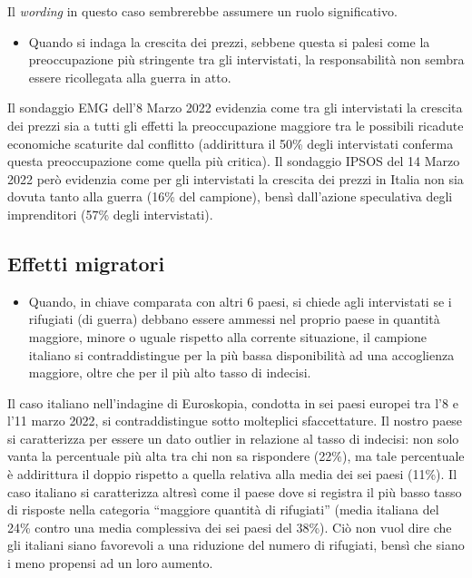 \documentclass[
]{book}
\providecommand{\tightlist}{%
  \setlength{\itemsep}{0pt}\setlength{\parskip}{0pt}}
\begin{document}
Il \emph{wording} in questo caso sembrerebbe assumere un ruolo significativo.

\begin{itemize}
\tightlist
\item
  Quando si indaga la crescita dei prezzi, sebbene questa si palesi come la preoccupazione più stringente tra gli intervistati, la responsabilità non sembra essere ricollegata alla guerra in atto.
\end{itemize}

Il sondaggio EMG dell'8 Marzo 2022 evidenzia come tra gli intervistati la crescita dei prezzi sia a tutti gli effetti la preoccupazione maggiore tra le possibili ricadute economiche scaturite dal conflitto (addirittura il 50\% degli intervistati conferma questa preoccupazione come quella più critica). Il sondaggio IPSOS del 14 Marzo 2022 però evidenzia come per gli intervistati la crescita dei prezzi in Italia non sia dovuta tanto alla guerra (16\% del campione), bensì dall'azione speculativa degli imprenditori (57\% degli intervistati).

\hypertarget{effetti-migratori}{%
\subsection{Effetti migratori}\label{effetti-migratori}}

\begin{itemize}
\tightlist
\item
  Quando, in chiave comparata con altri 6 paesi, si chiede agli intervistati se i rifugiati (di guerra) debbano essere ammessi nel proprio paese in quantità maggiore, minore o uguale rispetto alla corrente situazione, il campione italiano si contraddistingue per la più bassa disponibilità ad una accoglienza maggiore, oltre che per il più alto tasso di indecisi.
\end{itemize}

Il caso italiano nell'indagine di Euroskopia, condotta in sei paesi europei tra l'8 e l'11 marzo 2022, si contraddistingue sotto molteplici sfaccettature. Il nostro paese si caratterizza per essere un dato outlier in relazione al tasso di indecisi: non solo vanta la percentuale più alta tra chi non sa rispondere (22\%), ma tale percentuale è addirittura il doppio rispetto a quella relativa alla media dei sei paesi (11\%).
Il caso italiano si caratterizza altresì come il paese dove si registra il più basso tasso di risposte nella categoria ``maggiore quantità di rifugiati'' (media italiana del 24\% contro una media complessiva dei sei paesi del 38\%). Ciò non vuol dire che gli italiani siano favorevoli a una riduzione del numero di rifugiati, bensì che siano i meno propensi ad un loro aumento.
\end{document}
